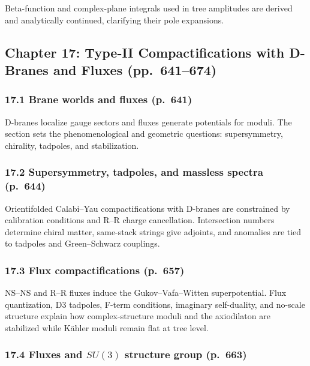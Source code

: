 \documentclass[
  10pt,
  a4paper,
  openany]{book}
\begin{document}
Beta-function and complex-plane integrals used in tree amplitudes are
derived and analytically continued, clarifying their pole expansions.

\subsection{Chapter 17: Type-II Compactifications with D-Branes and
Fluxes
(pp.~641--674)}\label{chapter-17-type-ii-compactifications-with-d-branes-and-fluxes-pp.-641674}

\subsubsection{17.1 Brane worlds and fluxes
(p.~641)}\label{brane-worlds-and-fluxes-p.-641}

D-branes localize gauge sectors and fluxes generate potentials for
moduli. The section sets the phenomenological and geometric questions:
supersymmetry, chirality, tadpoles, and stabilization.

\subsubsection{17.2 Supersymmetry, tadpoles, and massless spectra
(p.~644)}\label{supersymmetry-tadpoles-and-massless-spectra-p.-644}

Orientifolded Calabi--Yau compactifications with D-branes are
constrained by calibration conditions and R--R charge cancellation.
Intersection numbers determine chiral matter, same-stack strings give
adjoints, and anomalies are tied to tadpoles and Green--Schwarz
couplings.

\subsubsection{17.3 Flux compactifications
(p.~657)}\label{flux-compactifications-p.-657}

NS--NS and R--R fluxes induce the Gukov--Vafa--Witten superpotential.
Flux quantization, D3 tadpoles, F-term conditions, imaginary
self-duality, and no-scale structure explain how complex-structure
moduli and the axiodilaton are stabilized while Kähler moduli remain
flat at tree level.

\subsubsection{\texorpdfstring{17.4 Fluxes and \(SU(3)\) structure group
(p.~663)}{17.4 Fluxes and SU(3) structure group (p.~663)}}\label{fluxes-and-su3-structure-group-p.-663}
\end{document}
